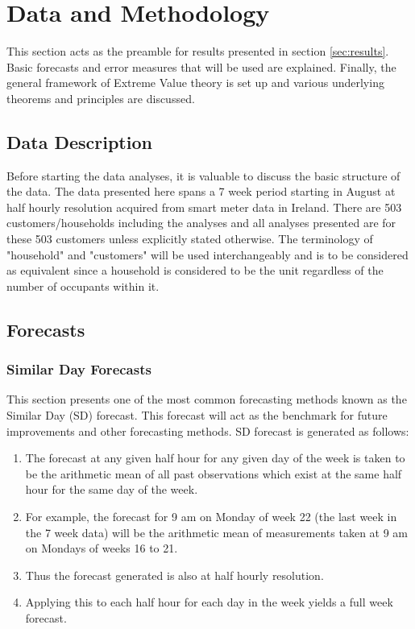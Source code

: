 \documentclass[a4paper]{article}
\begin{document}
\clearpage
\section{Data and Methodology}
\label{sec:D&M}
This section acts as the preamble for results presented in section \ref{sec:results}. Basic forecasts and error measures %
that will be used are explained. Finally, the general framework of Extreme Value theory is set up and various underlying theorems and principles are discussed.

\subsection{Data Description}
\label{subsec:DataDesc}
Before starting the data analyses, it is valuable to discuss the basic structure of the data. The data presented here spans a 7 week period starting in August at half hourly resolution acquired from smart meter data in Ireland. There are 503 customers/households including the analyses and all analyses presented are for these 503 customers unless explicitly stated otherwise. The terminology of "household" and "customers" will be used interchangeably and is to be considered as equivalent since a household is considered to be the unit regardless of the number of occupants within it.




\subsection{Forecasts}
\label{subsec:ForecastMethods}

\subsubsection{Similar Day Forecasts} \label{subsubsec:sdforecast}
This section presents one of the most common forecasting methods known as the Similar Day (SD) forecast. This forecast will act as the benchmark for future improvements and other forecasting methods. SD forecast is generated as follows:
\begin{enumerate}
\item The forecast at any given half hour for any given day of the week is taken to be the arithmetic mean of all past observations which exist at the same half hour for the same day of the week.
\item For example, the forecast for 9 am on Monday of week 22 (the last week in the 7 week data) will be the arithmetic mean of measurements taken at 9 am on Mondays of weeks 16 to 21.
\item Thus the forecast generated is also at half hourly resolution.
\item Applying this to each half hour for each day in the week yields a full week forecast.
\end{enumerate}
\end{document}
